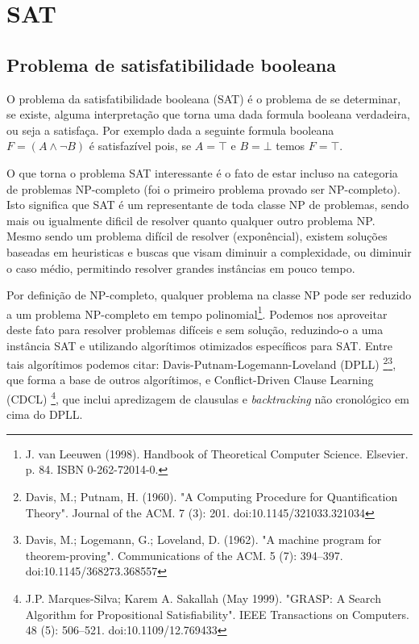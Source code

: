 \section{SAT}
\label{sec:sat}

\subsection{Problema de satisfatibilidade booleana}\label{sec:ssat}
O problema da satisfatibilidade booleana (SAT) é o problema de se determinar, se existe, alguma
interpretação que torna uma dada formula booleana verdadeira, ou seja a satisfaça. Por exemplo
dada a seguinte formula booleana $F = (A \land \neg B)$ é satisfazível pois, se $A = \top$ e $B = \bot$
temos $F = \top$.

O que torna o problema SAT interessante é o fato de estar incluso na categoria de
problemas NP-completo (foi o primeiro problema provado ser NP-completo). Isto significa que
SAT é um representante de toda classe NP de problemas, sendo mais ou igualmente dificil de
resolver quanto qualquer outro problema NP. Mesmo sendo um problema difícil de resolver (exponêncial),
existem soluções baseadas em heuristicas e buscas que visam diminuir a complexidade, ou
diminuir o caso médio, permitindo resolver grandes instâncias em pouco tempo.

Por definição de NP-completo, qualquer problema na classe NP pode ser reduzido a um problema
NP-completo em tempo polinomial\footnote{J. van Leeuwen (1998). Handbook of Theoretical Computer Science. Elsevier. p. 84. ISBN 0-262-72014-0.}. Podemos nos aproveitar deste fato para resolver problemas
difíceis e sem solução, reduzindo-o a uma instância SAT e utilizando algorítimos otimizados específicos
para SAT. Entre tais algorítimos podemos citar: Davis-Putnam-Logemann-Loveland (DPLL)
\footnote{Davis, M.; Putnam, H. (1960). "A Computing Procedure for Quantification Theory". Journal of the ACM. 7 (3): 201. doi:10.1145/321033.321034}\footnote{Davis, M.; Logemann, G.; Loveland, D. (1962). "A machine program for theorem-proving". Communications of the ACM. 5 (7): 394–397. doi:10.1145/368273.368557}, que forma a base de outros algorítimos, e Conflict-Driven Clause Learning (CDCL)
\footnote{J.P. Marques-Silva; Karem A. Sakallah (May 1999). "GRASP: A Search Algorithm for Propositional Satisfiability". IEEE Transactions on Computers. 48 (5): 506–521. doi:10.1109/12.769433}, que inclui
apredizagem de clausulas e \textit{backtracking} não cronológico em cima do DPLL.

